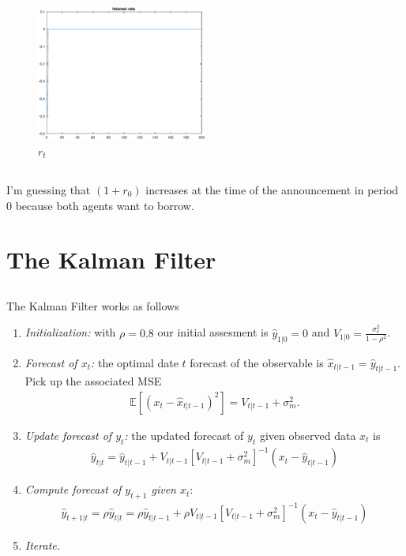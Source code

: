 \documentclass[12pt]{article}
\newcommand{\E}{\mathbb{E}}
\begin{document}
\begin{figure}[h]
    \centering
        \includegraphics[width=0.5\textwidth]{IRF_r.eps}
        \caption{$r_t$}
\end{figure}
 
\subsection{} I'm guessing that $(1+r_0)$ increases at the time of the announcement in period 0 because both agents want to borrow.

\newpage

\section{The Kalman Filter}
\subsection{}
The Kalman Filter works as follows
\begin{enumerate}
\item \textit{Initialization:} with $\rho=0.8$ our initial assesment is $\hat y_{1|0} = 0$ and $V_{1|0} = \frac{\sigma^2_e}{1-\rho^2}$. 
\item \textit{Forecast of $x_t$:} the optimal date $t$ forecast of the observable is $\hat x_{t|t-1} = \hat y_{t|t-1}$. Pick up the associated MSE
\begin{align*}
\E[(x_t - \hat x_{t|t-1})^2] = V_{t|t-1} + \sigma^2_m.
\end{align*}
\item \textit{Update forecast of $y_t$:} the updated forecast of $y_t$ given observed data $x_t$ is
\begin{align*}
\hat y_{t|t} = \hat y_{t|t-1} + V_{t|t-1}[V_{t|t-1} + \sigma^2_m]^{-1}(x_t - \hat y_{t|t-1})
\end{align*}
\item \textit{Compute forecast of $y_{t+1}$ given $x_t$}:
\begin{align*}
\hat y_{t+1|t} = \rho \hat y_{t|t} = \rho \hat y_{t|t-1} + \rho V_{t|t-1}[V_{t|t-1} + \sigma^2_m]^{-1}(x_t - \hat y_{t|t-1})
\end{align*}
\item \textit{Iterate.}
\end{enumerate}
\end{document}
